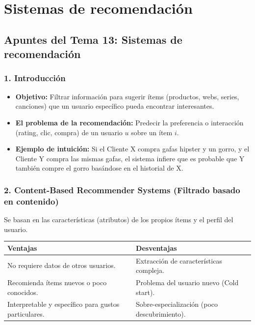 \chapter{Sistemas de recomendación}
\section{Apuntes del Tema 13: Sistemas de recomendación}

\subsection{1. Introducción}
\begin{itemize}
	\item \textbf{Objetivo:} Filtrar información para sugerir ítems (productos, webs, series, canciones) que un usuario específico pueda encontrar interesantes.
	\item \textbf{El problema de la recomendación:} Predecir la preferencia o interacción (rating, clic, compra) de un usuario $u$ sobre un ítem $i$.
	\item \textbf{Ejemplo de intuición:} Si el Cliente X compra gafas hipster y un gorro, y el Cliente Y compra las mismas gafas, el sistema infiere que es probable que Y también compre el gorro basándose en el historial de X.
\end{itemize}

\subsection{2. Content-Based Recommender Systems (Filtrado basado en contenido)}
Se basan en las características (atributos) de los propios ítems y el perfil del usuario.

\begin{table}[htbp]
	\centering
	\small
	\begin{tabular}{|p{5cm}|p{5cm}|}
		\hline
		\textbf{Ventajas} & \textbf{Desventajas} \\ \hline
		No requiere datos de otros usuarios. & Extracción de características compleja. \\ \hline
		Recomienda ítems nuevos o poco conocidos. & Problema del usuario nuevo (Cold start). \\ \hline
		Interpretable y específico para gustos particulares. & Sobre-especialización (poco descubrimiento). \\ \hline
	\end{tabular}
\end{table}

